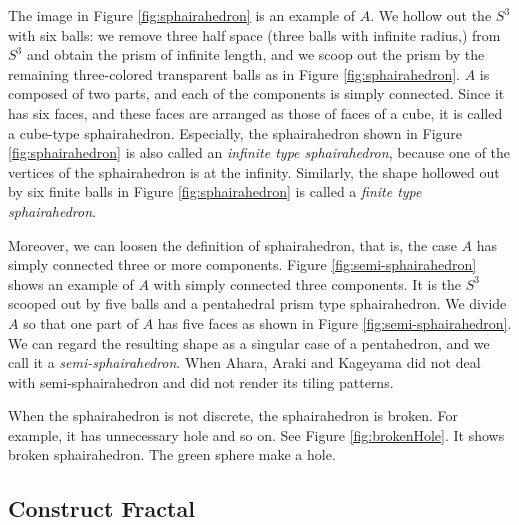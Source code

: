\documentclass[dvipdfmx]{interact}
\theoremstyle{plain}%
\theoremstyle{definition}
\theoremstyle{remark}
\theoremstyle{problemstyle}
\begin{document}
The image in Figure \ref{fig:sphairahedron}
is an example of $A$.
We hollow out the $S^3$ with six balls: we remove three half space
(three balls with infinite radius,) from $S^3$ and obtain the prism of
infinite length, and we scoop out the prism by the remaining
three-colored transparent balls as in Figure
\ref{fig:sphairahedron}.
$A$ is composed of two parts, and each of the components is simply connected.
Since it has six faces, and these faces are arranged as those of faces of
a cube, it is called a cube-type sphairahedron.
Especially, the sphairahedron shown in Figure 
\ref{fig:sphairahedron}
is also called an \textit{infinite type sphairahedron},
because one of the vertices of the sphairahedron is at the infinity.
Similarly, the shape hollowed out by six finite balls in Figure
\ref{fig:sphairahedron} is called a
\textit{finite type sphairahedron}.

Moreover, we can loosen the definition of sphairahedron,
that is, the case $A$ has simply connected three or more components.
Figure \ref{fig:semi-sphairahedron} shows an
example of $A$ with simply connected three components.
It is the $S^3$ scooped out by five balls and a pentahedral prism type
sphairahedron.
We divide $A$ so that one part of $A$ has five faces as shown in
Figure \ref{fig:semi-sphairahedron}.
We can regard the resulting shape as a singular case of a pentahedron,
and we call it a \textit{semi-sphairahedron}.
When Ahara, Araki and Kageyama did not deal with semi-sphairahedron and
did not render its tiling patterns.

When the sphairahedron is not discrete, the sphairahedron is broken.
For example, it has unnecessary hole and so on.
See Figure \ref{fig:brokenHole}. It shows broken sphairahedron.
The green sphere make a hole.

\subsection{Construct Fractal}\label{constructFractal}
\end{document}
